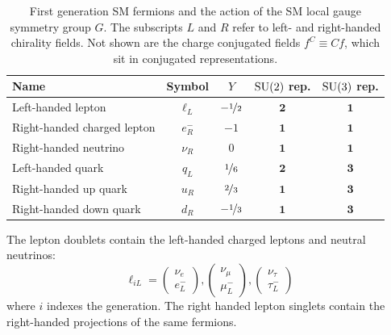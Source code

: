 \begin{table}[]
\begin{center}
    \caption{First generation SM fermions and the action of the SM local gauge symmetry group ${G}$.
             The subscripts ${L}$ and ${R}$ refer to left- and right-handed chirality fields.
             Not shown are the charge conjugated fields ${f^C \equiv Cf}$, which sit in conjugated representations.}
    \label{tab:theory:fermions}
    \begin{tabular}{l|c|c|c|c}
                Name & Symbol       & ${Y}$ & ${\operatorname{\mathrm{SU}}(2)}$ rep. & ${\operatorname{\mathrm{SU}}(3)}$ rep. \\
                \hline \hline
  Left-handed lepton & ${\ell_L}$     & ${-\nicefrac{1}{2}}$  & ${\mathbf{2}}$  & ${\mathbf{1}}$ \\  
 Right-handed charged lepton & ${e_R^-}$   & ${-1}$  & ${\mathbf{1}}$  & ${\mathbf{1}}$ \\  
 Right-handed neutrino & ${\nu_R}$   & ${0}$  & ${\mathbf{1}}$  & ${\mathbf{1}}$ \\  \hline
  Left-handed quark  & ${q  _L}$     & ${\nicefrac{1}{6}}$  & ${\mathbf{2}}$  & ${\mathbf{3}}$ \\  
 Right-handed up quark  & ${u  _R}$     & ${\nicefrac{2}{3}}$  & ${\mathbf{1}}$  & ${\mathbf{3}}$ \\ 
 Right-handed down quark  & ${d  _R}$     & ${-\nicefrac{1}{3}}$  & ${\mathbf{1}}$  & ${\mathbf{3}}$ \\  
    \end{tabular}
\end{center}
\end{table}

The lepton doublets contain the left-handed charged leptons and neutral neutrinos:
\begin{equation}
    \ell_{iL} = 
    \left(\begin{matrix} \nu_e \\ e_L^- \end{matrix}\right),
    \left(\begin{matrix} \nu_\mu \\ \mu_L^- \end{matrix}\right),
    \left(\begin{matrix} \nu_\tau \\ \tau_L^- \end{matrix}\right)
\end{equation}
where ${i}$ indexes the generation.
The right handed lepton singlets contain the right-handed projections of the same fermions.

